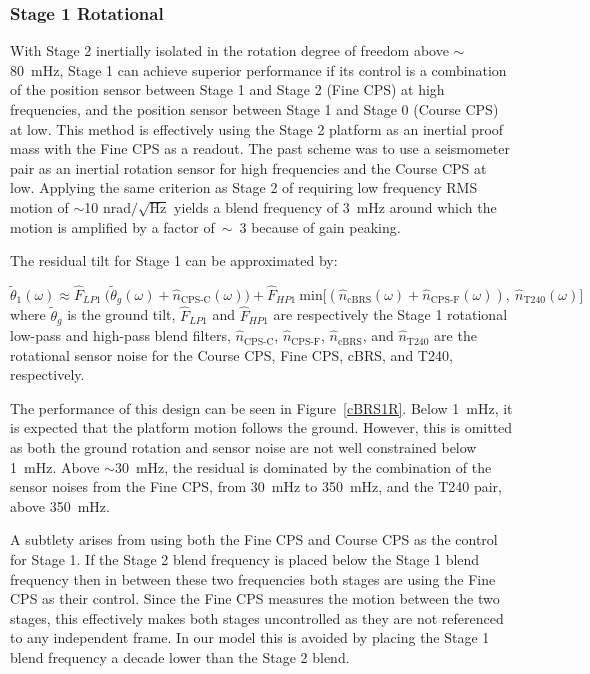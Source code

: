 \documentclass [12pt, proquest]{uwthesis}[2019]
\begin{document}
\subsubsection{Stage 1 Rotational}

With Stage 2 inertially isolated in the rotation degree of freedom above $\sim$80~mHz, Stage 1 can achieve superior performance if its control is a combination of the position sensor between Stage 1 and Stage 2 (Fine CPS) at high frequencies, and the position sensor between Stage 1 and Stage 0 (Course CPS) at low. This method is effectively using the Stage 2 platform as an inertial proof mass with the Fine CPS as a readout. The past scheme was to use a seismometer pair as an inertial rotation sensor for high frequencies and the Course CPS at low. Applying the same criterion as Stage 2 of requiring low frequency RMS motion of $\sim$10 nrad$/\sqrt{\text{Hz}}$ yields a blend frequency of 3~mHz around which the motion is amplified by a factor of~$\sim$~3 because of gain peaking. 

The residual tilt for Stage 1 can be approximated by:

\begin{equation}
\tilde{\theta}_1(\omega)\approx \hat{F}_{LP1}\ \big(\tilde{\theta}_g(\omega)+\hat{n}_\text{CPS-C}(\omega)\big)+\hat{F}_{HP1}\ \text{min}\big[(\hat{n}_\text{cBRS}(\omega)+\hat{n}_\text{CPS-F}(\omega)),\ \hat{n}_\text{T240}(\omega)\big]
\end{equation}
where $\tilde{\theta}_g$ is the ground tilt, $\hat{F}_{LP1}$ and $\hat{F}_{HP1}$ are respectively the Stage 1 rotational low-pass and high-pass blend filters, $\hat{n}_\text{CPS-C}$, $\hat{n}_\text{CPS-F}$, $\hat{n}_\text{cBRS}$, and $\hat{n}_\text{T240}$ are the rotational sensor noise for the Course CPS, Fine CPS, cBRS, and T240, respectively.

The performance of this design can be seen in Figure~\ref{cBRS1R}. Below 1~mHz, it is expected that the platform motion follows the ground. However, this is omitted as both the ground rotation and sensor noise are not well constrained below 1~mHz. Above $\sim$30~mHz, the residual is dominated by the combination of the sensor noises from the Fine CPS, from 30~mHz to 350~mHz, and the T240 pair, above 350~mHz.

A subtlety arises from using both the Fine CPS and Course CPS as the control for Stage 1. If the Stage 2 blend frequency is placed below the Stage 1 blend frequency then in between these two frequencies both stages are using the Fine CPS as their control. Since the Fine CPS measures the motion between the two stages, this effectively makes both stages uncontrolled as they are not referenced to any independent frame. In our model this is avoided by placing the Stage 1 blend frequency a decade lower than the Stage 2 blend.
\end{document}
